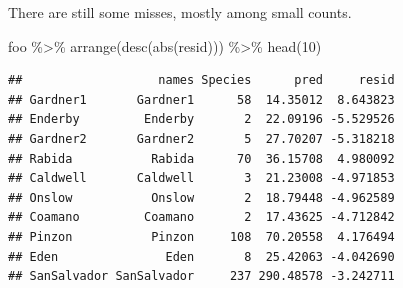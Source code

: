 \documentclass[
  ignorenonframetext,
]{beamer}
\newenvironment{Shaded}{\begin{snugshade}}{\end{snugshade}}
\newcommand{\DecValTok}[1]{\textcolor[rgb]{0.00,0.00,0.81}{#1}}
\newcommand{\FunctionTok}[1]{\textcolor[rgb]{0.00,0.00,0.00}{#1}}
\newcommand{\NormalTok}[1]{#1}
\newcommand{\SpecialCharTok}[1]{\textcolor[rgb]{0.00,0.00,0.00}{#1}}
\begin{document}
\begin{frame}[fragile]{}
\protect\hypertarget{section-25}{}
There are still some misses, mostly among small counts.

\vspace{12pt}
\tiny

\begin{Shaded}
\begin{Highlighting}[]
\NormalTok{foo }\SpecialCharTok{\%\textgreater{}\%} \FunctionTok{arrange}\NormalTok{(}\FunctionTok{desc}\NormalTok{(}\FunctionTok{abs}\NormalTok{(resid))) }\SpecialCharTok{\%\textgreater{}\%} \FunctionTok{head}\NormalTok{(}\DecValTok{10}\NormalTok{)}
\end{Highlighting}
\end{Shaded}

\begin{verbatim}
##                   names Species      pred     resid
## Gardner1       Gardner1      58  14.35012  8.643823
## Enderby         Enderby       2  22.09196 -5.529526
## Gardner2       Gardner2       5  27.70207 -5.318218
## Rabida           Rabida      70  36.15708  4.980092
## Caldwell       Caldwell       3  21.23008 -4.971853
## Onslow           Onslow       2  18.79448 -4.962589
## Coamano         Coamano       2  17.43625 -4.712842
## Pinzon           Pinzon     108  70.20558  4.176494
## Eden               Eden       8  25.42063 -4.042690
## SanSalvador SanSalvador     237 290.48578 -3.242711
\end{verbatim}
\end{frame}
\end{document}
